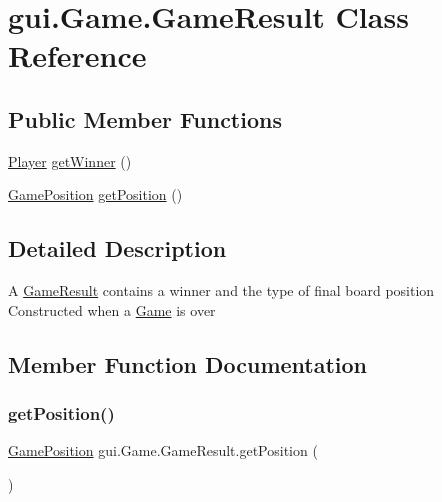 \hypertarget{classgui_1_1_game_1_1_game_result}{}\section{gui.\+Game.\+Game\+Result Class Reference}
\label{classgui_1_1_game_1_1_game_result}
\subsection*{Public Member Functions}
\begin{DoxyCompactItemize}
\item 
\mbox{\hyperlink{classplayers_1_1_player}{Player}} \mbox{\hyperlink{classgui_1_1_game_1_1_game_result_a916cdc5d16f546a3606bfaa7ca22cc39}{get\+Winner}} ()
\item 
\mbox{\hyperlink{enumgui_1_1_game_1_1_game_position}{Game\+Position}} \mbox{\hyperlink{classgui_1_1_game_1_1_game_result_a053cd82bf0f2b6bbe559ea86dc04e7b8}{get\+Position}} ()
\end{DoxyCompactItemize}


\subsection{Detailed Description}
A \mbox{\hyperlink{classgui_1_1_game_1_1_game_result}{Game\+Result}} contains a winner and the type of final board position Constructed when a \mbox{\hyperlink{classgui_1_1_game}{Game}} is over 

\subsection{Member Function Documentation}
\mbox{\label{classgui_1_1_game_1_1_game_result_a053cd82bf0f2b6bbe559ea86dc04e7b8}} 
\subsubsection{\texorpdfstring{get\+Position()}{getPosition()}}
{\footnotesize\ttfamily \mbox{\hyperlink{enumgui_1_1_game_1_1_game_position}{Game\+Position}} gui.\+Game.\+Game\+Result.\+get\+Position (\begin{DoxyParamCaption}{ }\end{DoxyParamCaption})}

